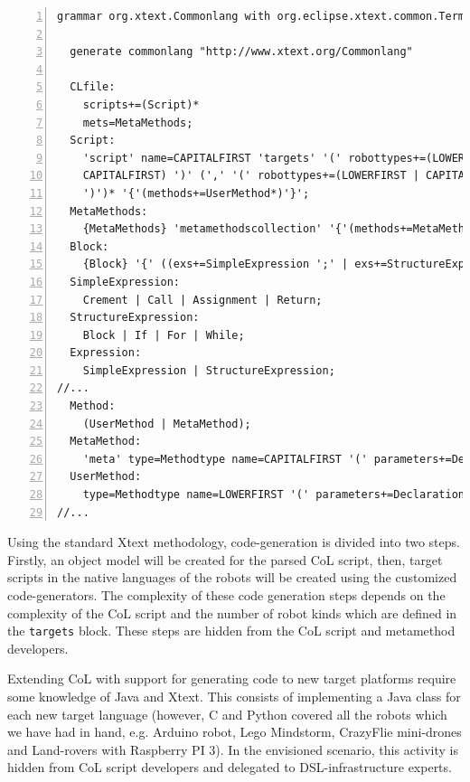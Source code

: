 \documentclass[runningheads]{llncs}
\begin{document}
\begin{lstlisting}[breaklines,style=AMMA,language=Xtext,mathescape,rulesepcolor=\color{black},caption=\small{Grammar of CommonLang} ,captionpos=t,label={lst:grammar},numbers=left]
  grammar org.xtext.Commonlang with org.eclipse.xtext.common.Terminals

  generate commonlang "http://www.xtext.org/Commonlang"

  CLfile:
	scripts+=(Script)*
	mets=MetaMethods;
  Script:
	'script' name=CAPITALFIRST 'targets' '(' robottypes+=(LOWERFIRST | CAPITALFIRST) ',' robotconfigs+=(LOWERFIRST |
	CAPITALFIRST) ')' (',' '(' robottypes+=(LOWERFIRST | CAPITALFIRST) ',' robotconfigs+=(LOWERFIRST | CAPITALFIRST)
	')')* '{'(methods+=UserMethod*)'}';
  MetaMethods:
	{MetaMethods} 'metamethodscollection' '{'(methods+=MetaMethod)*'}';
  Block:
	{Block} '{' ((exs+=SimpleExpression ';' | exs+=StructureExpression))* '}';
  SimpleExpression:
	Crement | Call | Assignment | Return;
  StructureExpression:
	Block | If | For | While;
  Expression:
	SimpleExpression | StructureExpression;
//...
  Method:
	(UserMethod | MetaMethod);
  MetaMethod:
	'meta' type=Methodtype name=CAPITALFIRST '(' parameters+=Declaration? (','+ parameters+=Declaration)* ')' ';';
  UserMethod:
	type=Methodtype name=LOWERFIRST '(' parameters+=Declaration? (','+ parameters+=Declaration)* ')' bl=Block;
//...
\end{lstlisting}


Using the standard Xtext methodology, code-generation is divided into two steps.
Firstly, an object model will be created for the parsed CoL script, then, target scripts in the native languages of the robots will be created using the customized code-generators.
The complexity of these code generation steps depends on the complexity of the CoL script and the number of robot kinds which are defined in the \texttt{targets} block.
These steps are hidden from the CoL script and metamethod developers.

Extending CoL with support for generating code to new target platforms require some knowledge of Java and Xtext. 
This consists of implementing a Java class for each new target language (however, C and Python covered all the robots which we have had in hand, e.g. Arduino robot, Lego Mindstorm, CrazyFlie mini-drones and Land-rovers with Raspberry PI 3).
In the envisioned scenario, this activity is hidden from CoL script developers and delegated to DSL-infrastructure experts.
\end{document}
